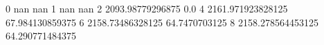 0 nan nan
1 nan nan
2 2093.98779296875 0.0
4 2161.971923828125 67.984130859375
6 2158.73486328125 64.7470703125
8 2158.278564453125 64.290771484375

